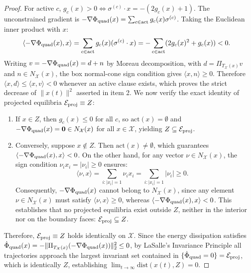 \documentclass[11pt,a4paper]{article}
\begin{document}
\begin{proof}
For active $c$, $g_c(x) > 0 \iff \sigma^{(c)} \cdot x = -(2 g_c(x) + 1)$.
The unconstrained gradient is $-\nabla \Phi_{\rm quad}(x) = \sum_{c \in \text{act}} g_c(x) \sigma^{(c)}$. Taking the Euclidean inner product with $x$:
\begin{equation}
\langle -\nabla \Phi_{\rm quad}(x), x \rangle = \sum_{c \in \text{act}} g_c(x)(\sigma^{(c)} \cdot x) = -\sum_{c \in \text{act}} (2 g_c(x)^2 + g_c(x)) < 0.
\end{equation}
Writing $v=-\nabla\Phi_{\rm quad}(x)=d+n$ by Moreau decomposition, with $d=\Pi_{T_{\mathcal X}(x)}v$ and $n\in N_{\mathcal X}(x)$, the box normal-cone sign condition gives $\langle x,n\rangle\ge0$. Therefore $\langle x,d\rangle\le\langle x,v\rangle<0$ whenever an active clause exists, which proves the strict decrease of $\|x(t)\|^2$ asserted in item 2.
We now verify the exact identity of projected equilibria $\mathcal{E}_{\rm proj} \equiv Z$:
\begin{enumerate}
    \item If $x \in Z$, then $g_c(x) \le 0$ for all $c$, so $\text{act}(x) = \emptyset$ and $-\nabla \Phi_{\rm quad}(x) = \mathbf{0} \in N_{\mathcal{X}}(x)$ for all $x \in \mathcal{X}$, yielding $Z \subseteq \mathcal{E}_{\rm proj}$.
    \item Conversely, suppose $x \notin Z$. Then $\text{act}(x) \ne \emptyset$, which guarantees $\langle -\nabla \Phi_{\rm quad}(x), x \rangle < 0$. On the other hand, for any vector $\nu \in N_{\mathcal{X}}(x)$, the sign condition $\nu_i x_i = |\nu_i| \ge 0$ ensures:
    \begin{equation}
    \langle \nu, x \rangle = \sum_{i: |x_i|=1} \nu_i x_i = \sum_{i: |x_i|=1} |\nu_i| \ge 0.
    \end{equation}
    Consequently, $-\nabla \Phi_{\rm quad}(x)$ cannot belong to $N_{\mathcal{X}}(x)$, since any element $\nu \in N_{\mathcal{X}}(x)$ must satisfy $\langle \nu, x \rangle \ge 0$, whereas $\langle -\nabla \Phi_{\rm quad}(x), x \rangle < 0$. This establishes that no projected equilibria exist outside $Z$, neither in the interior nor on the boundary faces: $\mathcal{E}_{\rm proj} \subseteq Z$.
\end{enumerate}
Therefore, $\mathcal{E}_{\rm proj} \equiv Z$ holds identically on $\mathcal{X}$. Since the energy dissipation satisfies $\dot{\Phi}_{\rm quad}(x) = -\|\Pi_{T_{\mathcal{X}}(x)}(-\nabla \Phi_{\rm quad}(x))\|_2^2 \le 0$, by LaSalle's Invariance Principle all trajectories approach the largest invariant set contained in $\{\dot{\Phi}_{\rm quad} = 0\} = \mathcal{E}_{\rm proj}$, which is identically $Z$, establishing $\lim_{t \to \infty} \text{dist}(x(t), Z) = 0$.
\end{proof}
\end{document}
